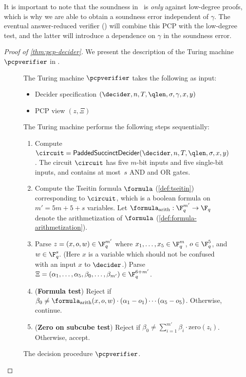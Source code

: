 It is important to note that the soundness in~ is
\emph{only} against low-degree proofs, which is why we are able to
obtain a soundness error independent of $\gamma$. The eventual
answer-reduced verifier () will combine this PCP with the low-degree
test, and the latter will introduce a dependence on $\gamma$ in the
soundness error.

\begin{proof}[Proof of \cref{thm:pcp-decider}]


  We present the description of the Turing machine $\pcpverifier$ in
  .
  
\begin{figure}[!htb]
  \begin{gamespec}
  The Turing machine $\pcpverifier$ takes the following as input:
	\begin{itemize}
		\item Decider specification $(\decider, n, T, \qlen,
      \sigma, \gamma, x, y)$
      	\item PCP view $(z,\Xi)$
	\end{itemize}
	The Turing machine performs the following steps sequentially:
  \begin{enumerate}
  \item \label{enu:compute-circuit} Compute $\circuit =
    \paddedsuccinctdecider(\decider, n, T, \qlen, \sigma, x, y)$.
    The circuit $\circuit$ has five $m$-bit inputs and five single-bit inputs,
    and contains at most~$s$ AND and OR gates.
    


  \item \label{enu:compute-tseitin-formula} Compute the Tseitin formula
    $\formula$ (\cref{def:tseitin}) corresponding to $\circuit$, which is a boolean formula on $m' =
    5m + 5 + s$ variables.
    Let $\formula_{\mathrm{arith}}: \F_q^{m'} \to \F_q$ denote the
    arithmetization of $\formula$ (\cref{def:formula-arithmetization}).
  \item \label{enu:parse-input} Parse $z = (x,o,w) \in \F_q^{m'}$ where
    $x_1,\ldots,x_5 \in \F_q^m$, $o \in \F_q^5$, and $w \in \F_q^s$. (Here $x$ is a variable which should not be confused with an input $x$ to $\decider$.)
    Parse $\Xi = (\alpha_1,\ldots,\alpha_5,\beta_0,\ldots,\beta_{m'}) \in
    \F_q^{6 + m'}$.
  
  \item (\textbf{Formula test}) \label{enu:formula-test} Reject if $\beta_0 \neq
    \formula_{\mathrm{arith}}(x,o,w) \cdot (\alpha_1 - o_1) \cdots (\alpha_5 -
    o_5)$.
    Otherwise, continue.
  \item (\textbf{Zero on subcube test}) \label{enu:zero-test} Reject if $\beta_0
    \neq \sum_{i=1}^{m'} \beta_i \cdot \mathrm{zero}(z_i)$.
    Otherwise, accept.
  \end{enumerate}
  \end{gamespec}
\caption{The decision procedure $\pcpverifier$.}
\label{fig:pcpverifier}
\end{figure}


\end{proof}
